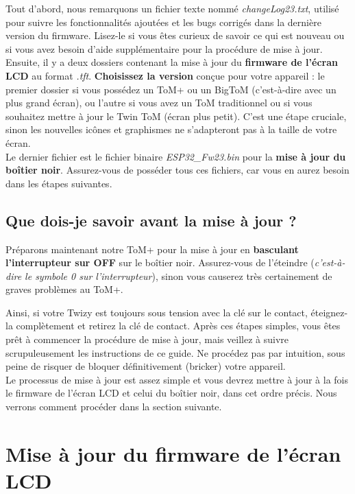 Tout d'abord, nous remarquons un fichier texte nommé \textit{changeLog23.txt}, utilisé pour suivre
les fonctionnalités ajoutées et les bugs corrigés dans la dernière version du firmware. Lisez-le si vous êtes
curieux de savoir ce qui est nouveau ou si vous avez besoin d'aide supplémentaire pour la procédure de mise à jour.\\

Ensuite, il y a deux dossiers contenant la mise à jour du \textbf{firmware de l'écran LCD} au format \textit{.tft}.
\textbf{Choisissez la version} conçue pour votre appareil : le premier dossier si vous possédez un ToM+ ou un
BigToM (c'est-à-dire avec un plus grand écran), ou l'autre si vous avez un ToM traditionnel ou si
vous souhaitez mettre à jour le Twin ToM (écran plus petit). C'est une étape
cruciale, sinon les nouvelles icônes et graphismes ne s'adapteront pas à la taille de votre écran.\\

Le dernier fichier est le fichier binaire \textit{ESP32\_Fw23.bin} pour la \textbf{mise à jour du boîtier noir}.
Assurez-vous de posséder tous ces fichiers, car vous en aurez besoin dans les étapes suivantes.

\subsection{Que dois-je savoir avant la mise à jour ?}

Préparons maintenant notre ToM+ pour la mise à jour en \textbf{basculant l'interrupteur sur OFF} sur le
boîtier noir. Assurez-vous de l'éteindre (\textit{c'est-à-dire le symbole 0 sur l'interrupteur}), sinon
vous causerez très certainement de graves problèmes au ToM+.

Ainsi, si votre Twizy est toujours sous tension avec la clé sur le contact, éteignez-la complètement
et retirez la clé de contact. Après ces étapes simples, vous êtes prêt à commencer la procédure
de mise à jour, mais veillez à suivre scrupuleusement les instructions de ce guide. Ne
procédez pas par intuition, sous peine de risquer de bloquer définitivement (bricker) votre appareil.\\

Le processus de mise à jour est assez simple et vous devrez mettre à jour à la fois le firmware de l'écran LCD
et celui du boîtier noir, dans cet ordre précis. Nous verrons comment procéder dans la section suivante.



\section{Mise à jour du firmware de l'écran LCD}

